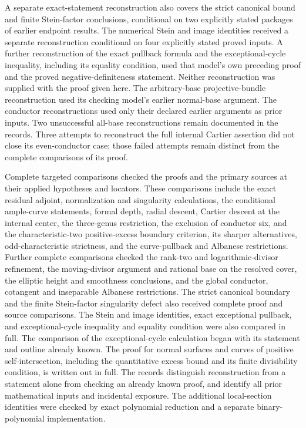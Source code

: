 \documentclass[11pt]{article}
\theoremstyle{remark}\newtheorem{remark}[theorem]{Remark}
\begin{document}
A separate exact-statement reconstruction also covers the strict
canonical bound and finite Stein-factor conclusions, conditional on
two explicitly stated packages of earlier endpoint results.
The numerical Stein and image identities received a separate
reconstruction conditional on four explicitly stated proved inputs.
A further reconstruction of the exact pullback formula and the
exceptional-cycle inequality, including its equality condition,
used that model's own preceding proof and the proved
negative-definiteness statement.
Neither reconstruction was supplied with the proof given here.
The arbitrary-base projective-bundle reconstruction
used its checking model's earlier normal-base argument. The conductor
reconstructions used only their declared earlier arguments as prior inputs.
Two unsuccessful all-base reconstructions remain documented in the records.
Three attempts to reconstruct the full internal Cartier assertion did not
close its even-conductor case; those failed attempts remain distinct
from the complete comparisons of its proof.

Complete targeted comparisons checked the proofs and the primary sources at
their applied hypotheses and locators. These comparisons include the exact
residual adjoint, normalization and singularity calculations, the conditional
ample-curve statements, formal depth, radial descent, Cartier descent
at the internal center, the three-genus
restriction, the exclusion of conductor six, and the characteristic-two
positive-excess boundary criterion, its sharper alternatives,
odd-characteristic strictness, and the curve-pullback and Albanese
restrictions. Further complete comparisons checked the rank-two and logarithmic-divisor refinement, the moving-divisor argument and rational base on the resolved cover, the elliptic height and smoothness conclusions, and the global conductor, cotangent and inseparable Albanese restrictions. The strict canonical boundary and the finite Stein-factor singularity defect also received complete proof and source comparisons. The Stein and image identities, exact exceptional pullback, and exceptional-cycle inequality and equality condition were also compared in full. The comparison of the exceptional-cycle calculation began with its statement and outline already known. The proof for normal surfaces and curves of positive self-intersection,
including the quantitative excess bound and its finite divisibility
condition, is written out in full. The records distinguish reconstruction from a statement alone from
checking an already known proof, and identify all prior mathematical inputs
and incidental exposure. The additional local-section identities were checked
by exact polynomial reduction and a separate binary-polynomial implementation.
\end{document}
